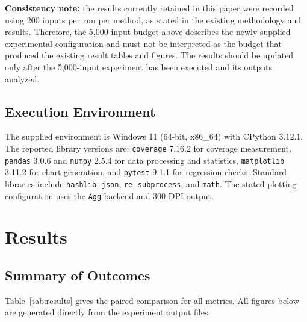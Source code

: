 \documentclass[12pt,onecolumn]{IEEEtran}
\begin{document}
\textbf{Consistency note:} the results currently retained in this paper were recorded using 200 inputs per run per method, as stated in the existing methodology and results. Therefore, the 5,000-input budget above describes the newly supplied experimental configuration and must not be interpreted as the budget that produced the existing result tables and figures. The results should be updated only after the 5,000-input experiment has been executed and its outputs analyzed.

\subsection{Execution Environment}

The supplied environment is Windows 11 (64-bit, x86\_64) with CPython 3.12.1. The reported library versions are: \texttt{coverage} 7.16.2 for coverage measurement, \texttt{pandas} 3.0.6 and \texttt{numpy} 2.5.4 for data processing and statistics, \texttt{matplotlib} 3.11.2 for chart generation, and \texttt{pytest} 9.1.1 for regression checks. Standard libraries include \texttt{hashlib}, \texttt{json}, \texttt{re}, \texttt{subprocess}, and \texttt{math}. The stated plotting configuration uses the \texttt{Agg} backend and 300-DPI output.

\section{Results}

\subsection{Summary of Outcomes}

Table~\ref{tab:results} gives the paired comparison for all metrics. All figures below are generated directly from the experiment output files.
\end{document}
